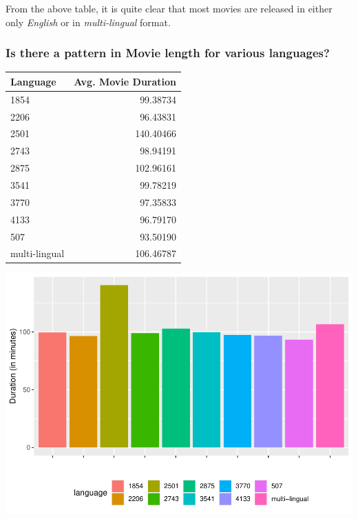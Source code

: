 \documentclass[11pt,a4paper,]{article}
\begin{document}
From the above table, it is quite clear that most movies are released in either only \emph{English} or in \emph{multi-lingual} format.

\hypertarget{is-there-a-pattern-in-movie-length-for-various-languages}{%
\subsubsection{Is there a pattern in Movie length for various languages?}\label{is-there-a-pattern-in-movie-length-for-various-languages}}

\begin{table}[H]
\centering
\begin{tabular}{l|r}
\hline
Language & Avg. Movie Duration\\
\hline
1854 & 99.38734\\
\hline
2206 & 96.43831\\
\hline
2501 & 140.40466\\
\hline
2743 & 98.94191\\
\hline
2875 & 102.96161\\
\hline
3541 & 99.78219\\
\hline
3770 & 97.35833\\
\hline
4133 & 96.79170\\
\hline
507 & 93.50190\\
\hline
multi-lingual & 106.46787\\
\hline
\end{tabular}
\end{table}

\begin{center}\includegraphics{Report_files/figure-latex/10-1} \end{center}
\end{document}
